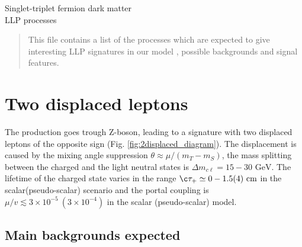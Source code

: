 \documentclass[12pt,letterpaper,notitlepage]{article}
\begin{document}
\begin{center}
\LARGE Singlet-triplet fermion dark matter\\
\Large LLP processes
\end{center}

\vspace{1.0cm}
\begin{abstract}
\vspace{0.2cm}\noindent
This file contains a list of the processes which are expected to give interesting LLP signatures in our model \cite{Filimonova:2018qdc}, possible backgrounds and signal features.
\end{abstract}

\section{Two displaced leptons}

The production goes trough Z-boson, leading to a signature with two displaced leptons of the opposite sign (Fig. \ref{fig:2displaced_diagram}). The displacement is caused by the mixing angle suppression $\theta \approx \mu/(m_T - m_S)$, the mass splitting between the charged and the light neutral states is $\Delta m_{c \ell} = 15-30 \text{ GeV}$. The lifetime of the charged state varies in the range $\c \tau_+ \simeq 0-1.5(4) \text{ cm}$ in the scalar(pseudo-scalar) scenario and the portal coupling is $\mu/v \lesssim 3\times 10^{-5}\ (3\times 10^{-4})$ in the scalar (pseudo-scalar) model.

\subsection{Main backgrounds expected}
\end{document}
